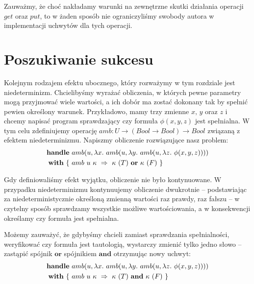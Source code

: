 Zauważmy, że choć nakładamy warunki na zewnętrzne skutki działania operacji \(get\) oraz \(put\), to w żaden sposób nie ograniczyliśmy swobody autora w implementacji uchwytów dla tych operacji. %


\section{Poszukiwanie sukcesu}

Kolejnym rodzajem efektu ubocznego, który rozważymy w tym rozdziale jest niedeterminizm. Chcielibyśmy wyrażać obliczenia, w których pewne parametry mogą przyjmować wiele wartości, a ich dobór ma zostać dokonany tak by spełnić pewien określony warunek. Przykładowo, mamy trzy zmienne \(x,\, y\) oraz \(z\) i chcemy napisać program sprawdzający czy formuła \(\phi(x, y, z)\) jest spełnialna. W tym celu zdefiniujemy operację \(amb: U \rightarrow (Bool \rightarrow Bool) \rightarrow \mathit{Bool}\) związaną z efektem niedeterminizmu. Napiszmy obliczenie rozwiązujące nasz problem:
\begin{equation}\begin{split}
  \handle{
    &\op{amb}{u}{\fun{x}{
        \op{amb}{u}{\fun{y}{
            \op{amb}{u}{\fun{z}{
                \phi(x, y, z)
            }}
        }}
    }}\\
  }{ \{ \ &\hcase{amb}{u\ \kappa}{ \kappa\ (T) \ \mathbf{or} \ \kappa\ (F) } \ \} }
\end{split}\end{equation}

Gdy definiowaliśmy efekt wyjątku, obliczenie nie było kontynuowane. W przypadku niedeterminizmu kontynuujemy obliczenie dwukrotnie -- podstawiając za niedeterministycznie określoną zmienną wartości raz prawdy, raz fałszu -- w czytelny sposób sprawdzamy wszystkie możliwe wartościowania, a w konsekwencji określamy czy formuła jest spełnialna.

Możemy zauważyć, że gdybyśmy chcieli zamiast sprawdzania spełnialności, weryfikować czy formuła jest tautologią, wystarczy zmienić tylko jedno słowo -- zastąpić spójnik \(\mathbf{or}\) spójnikiem \(\mathbf{and}\) otrzymując nowy uchwyt:
\begin{equation}\begin{split}
  \handle{
    &\op{amb}{u}{\fun{x}{
        \op{amb}{u}{\fun{y}{
            \op{amb}{u}{\fun{z}{
                \phi(x, y, z)
            }}
        }}
    }}\\
  }{ \{ \ &\hcase{amb}{u\ \kappa}{ \kappa\ (T) \ \mathbf{and} \ \kappa\ (F) } \ \} }
\end{split}\end{equation}

